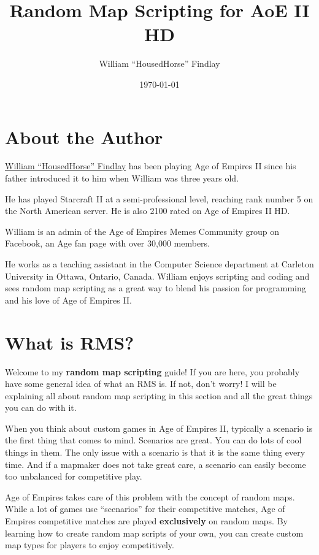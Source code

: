 \documentclass[]{article}
\title{Random Map Scripting for AoE II HD}
\author{William ``HousedHorse'' Findlay}
\date{\today}
\theoremstyle{plain}
\theoremstyle{remark}
\theoremstyle{definition}
\begin{document}
\maketitle

\newpage
\pagestyle{plain}
\tableofcontents
\newpage
\lstlistoflistings
\newpage
\pagestyle{fancy}

\hypertarget{about-the-author}{%
\section{About the Author}\label{about-the-author}}

\href{http://www.wfindlay.com/}{William ``HousedHorse'' Findlay} has
been playing Age of Empires II since his father introduced it to him
when William was three years old.

He has played Starcraft II at a semi-professional level, reaching rank
number 5 on the North American server. He is also 2100 rated on Age of
Empires II HD.

William is an admin of the Age of Empires Memes Community group on
Facebook, an Age fan page with over 30,000 members.

He works as a teaching assistant in the Computer Science department at
Carleton University in Ottawa, Ontario, Canada. William enjoys scripting
and coding and sees random map scripting as a great way to blend his
passion for programming and his love of Age of Empires II.

\hypertarget{what-is-rms}{%
\section{What is RMS?}\label{what-is-rms}}

Welcome to my \textbf{random map scripting} guide! If you are here, you
probably have some general idea of what an RMS is. If not, don't worry!
I will be explaining all about random map scripting in this section and
all the great things you can do with it.

When you think about custom games in Age of Empires II, typically a
scenario is the first thing that comes to mind. Scenarios are great. You
can do lots of cool things in them. The only issue with a scenario is
that it is the same thing every time. And if a mapmaker does not take
great care, a scenario can easily become too unbalanced for competitive
play.

Age of Empires takes care of this problem with the concept of random
maps. While a lot of games use ``scenarios'' for their competitive
matches, Age of Empires competitive matches are played
\textbf{exclusively} on random maps. By learning how to create random
map scripts of your own, you can create custom map types for players to
enjoy competitively.
\end{document}
